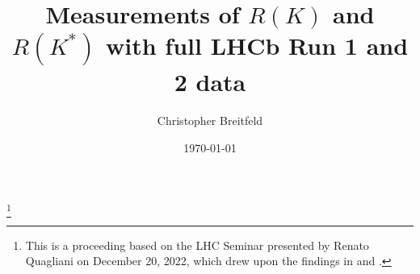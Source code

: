 




\title{Measurements of $R(K)$ and $R(K^*)$ with full LHCb Run 1 and 2 data}%
\thanks{This is a proceeding based on the LHC Seminar presented by Renato Quagliani on December 20, 2022, which drew upon the findings in \cite{lhcbcollaboration2022measurement} and \cite{lhcbcollaboration2022test}.}

\author{Christopher Breitfeld}

\date{\today}

\linenumbers


\maketitle







